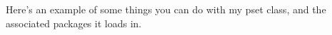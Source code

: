 \documentclass[rblock]{fkpset}
\begin{document}
  \pointstable{}



  \begin{problem}[1 (Sagan 1.13)]
    Here's an example of some things you can do with my pset class,
    and the associated packages it loads in.
  \end{problem}
\end{document}
